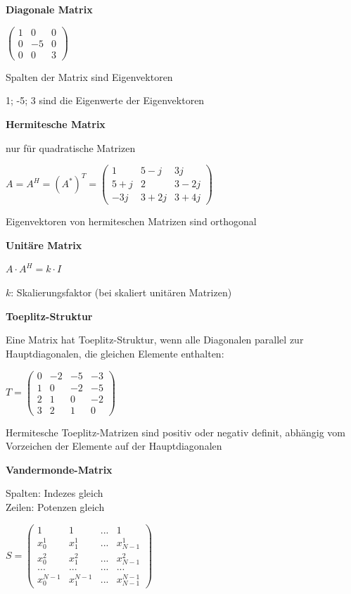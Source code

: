 \textbf{Diagonale Matrix}

$\displaystyle{
    \begin{pmatrix}
        1 & 0 & 0\\
        0 & -5 & 0\\
        0 & 0 & 3
    \end{pmatrix}
}$

Spalten der Matrix sind Eigenvektoren

1; -5; 3 sind die Eigenwerte der Eigenvektoren

\textbf{Hermitesche Matrix}

nur für quadratische Matrizen

$\displaystyle{
    A = A^H = (A^*)^T =
    \begin{pmatrix}
        1 & 5 - j & 3j\\
        5 + j & 2 & 3 - 2j\\
        -3j & 3 + 2j & 3 +4j
    \end{pmatrix}
}$

Eigenvektoren von hermiteschen Matrizen sind orthogonal

\textbf{Unitäre Matrix}

$\displaystyle{
    A \cdot A^H = k \cdot I
}$

$k$: Skalierungsfaktor (bei skaliert unitären Matrizen)

\textbf{Toeplitz-Struktur}

Eine Matrix hat Toeplitz-Struktur, wenn alle Diagonalen parallel zur Hauptdiagonalen, die gleichen Elemente enthalten:

$\displaystyle{
    T =
    \begin{pmatrix}
        0 & -2 & -5 & -3\\
        1 & 0 & -2 & -5 \\
        2 & 1 & 0 & -2  \\
        3 & 2 & 1 & 0
    \end{pmatrix}
}$
 
Hermitesche Toeplitz-Matrizen sind positiv oder negativ definit, abhängig vom Vorzeichen der
Elemente auf der Hauptdiagonalen

\textbf{Vandermonde-Matrix}

Spalten: Indezes gleich\\
Zeilen: Potenzen gleich

$\displaystyle{
    S =
    \begin{pmatrix}
        1 & 1 & ... & 1\\
        x_0^1 & x_1^1 & ... & x_{N-1}^1\\
        x_0^2 & x_1^2 & ... & x_{N-1}^2\\
        ... & ... & ... & ...\\
        x_0^{N-1} & x_1^{N-1} & ... & x_{N-1}^{N-1}
    \end{pmatrix}
}$

